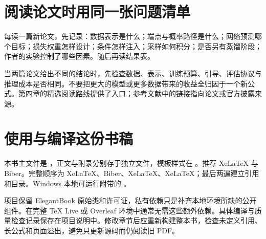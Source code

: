 \section{阅读论文时用同一张问题清单}
每读一篇新论文，先记录：数据表示是什么；端点与概率路径是什么；网络预测哪个目标；损失权重怎样设计；条件怎样注入；采样如何积分；是否另有蒸馏阶段；作者的实验控制了哪些因素。随后再读结果表。

当两篇论文给出不同的结论时，先检查数据、表示、训练预算、引导、评估协议与推理成本是否相同。不要把更大的模型或更多数据带来的收益全归因于一个新公式。第四章的精选阅读路线提供了入口；参考文献中的链接指向论文或官方披露来源。

\section{使用与编译这份书稿}
本书主文件是 ，正文与附录分别存于独立文件，模板样式在 。推荐 XeLaTeX 与 Biber。完整顺序为 XeLaTeX、Biber、XeLaTeX、XeLaTeX；最后两遍建立引用和目录。Windows 本地可运行附带的 。

项目保留 ElegantBook 原始类和许可证，私有依赖只是补齐本地环境所缺的公开组件。在完整 TeX Live 或 Overleaf 环境中通常无需这些额外依赖。具体编译与质量检查记录保存在项目说明中。修改章节后应重新构建整本书，检查未定义引用、长公式和页面溢出，避免只更新源码而仍阅读旧 PDF。
